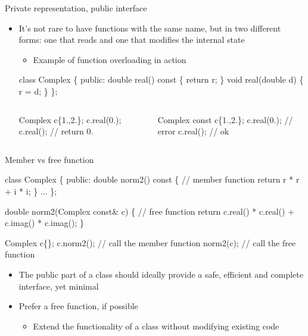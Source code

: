 \begin{frame}[fragile]{Private representation, public interface
    \insertcontinuationtext}

  \begin{itemize}

  \item It's not rare to have functions with the same name, but in two different
    forms: one that reads and one that modifies the internal state
    \begin{itemize}
    \item Example of function overloading in action
    \end{itemize}

    \begin{codeblock}
class Complex \{
 public:
  double real()         const \{ return r; \}
  void   real(double d)       \{ r = d; \}
  \ddd
\};\end{codeblock}

    \begin{columns}
      \begin{column}{.5\textwidth}
        \begin{codeblock}
Complex c\{1.,2.\};
c.real(0.);
c.real();           // return 0.\end{codeblock}
      \end{column}
      \begin{column}{.5\textwidth}
        \begin{codeblock}
Complex const c\{1.,2.\};
c.real(0.);         // error
c.real();           // ok\end{codeblock}
      \end{column}
    \end{columns}
  \end{itemize}

\end{frame}

\begin{frame}[fragile]{Member vs free function}
  \begin{codeblock}
class Complex \{
 public:
  double norm2() const \{ // \alert<1>{member function}
    return r * r + i * i;
  \}
  ...
\};

double norm2(Complex const& c) \{ // \alert<1>{free function}
  return c.real() * c.real() + c.imag() * c.imag();
\}

Complex c\{\ddd\};
c.norm2(); // call the member function
norm2(c);  // call the free function\end{codeblock}

  \pause
  \begin{itemize}
  \item The public part of a class should ideally provide a safe, efficient and
    complete interface, yet minimal
  \item Prefer a free function, if possible
    \begin{itemize}
    \item Extend the functionality of a class without modifying existing code
    \end{itemize}
  \end{itemize}

\end{frame}

